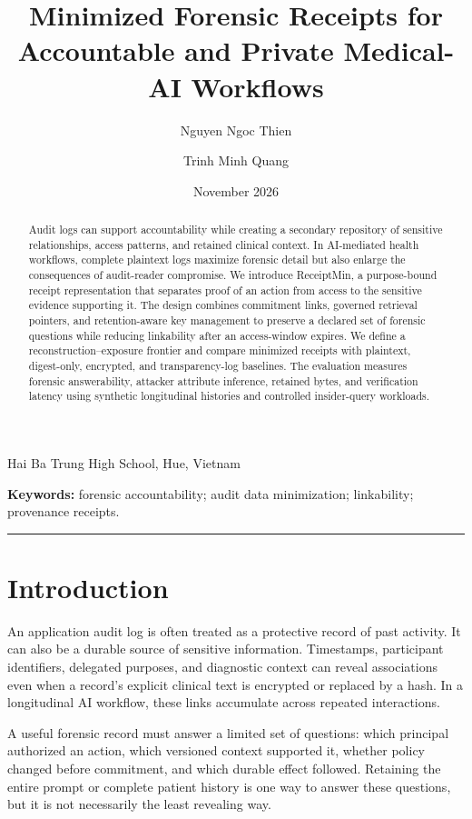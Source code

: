\documentclass[11pt,a4paper]{article}
\title{\vspace{-1em}\textbf{Minimized Forensic Receipts for Accountable and Private Medical-AI Workflows}}
\author{Nguyen Ngoc Thien \and Trinh Minh Quang}\date{November 2026}
\begin{document}
\maketitle
\begin{center}\small Hai Ba Trung High School, Hue, Vietnam\end{center}
\begin{abstract}
Audit logs can support accountability while creating a secondary repository of sensitive relationships, access patterns, and retained clinical context. In AI-mediated health workflows, complete plaintext logs maximize forensic detail but also enlarge the consequences of audit-reader compromise. We introduce ReceiptMin, a purpose-bound receipt representation that separates proof of an action from access to the sensitive evidence supporting it. The design combines commitment links, governed retrieval pointers, and retention-aware key management to preserve a declared set of forensic questions while reducing linkability after an access-window expires. We define a reconstruction–exposure frontier and compare minimized receipts with plaintext, digest-only, encrypted, and transparency-log baselines. The evaluation measures forensic answerability, attacker attribute inference, retained bytes, and verification latency using synthetic longitudinal histories and controlled insider-query workloads.
\end{abstract}
\noindent\textbf{Keywords:} forensic accountability; audit data minimization; linkability; provenance receipts.
\medskip\hrule\medskip

\section{Introduction}
An application audit log is often treated as a protective record of past activity. It can also be a durable source of sensitive information. Timestamps, participant identifiers, delegated purposes, and diagnostic context can reveal associations even when a record's explicit clinical text is encrypted or replaced by a hash. In a longitudinal AI workflow, these links accumulate across repeated interactions.

A useful forensic record must answer a limited set of questions: which principal authorized an action, which versioned context supported it, whether policy changed before commitment, and which durable effect followed. Retaining the entire prompt or complete patient history is one way to answer these questions, but it is not necessarily the least revealing way.
\end{document}
